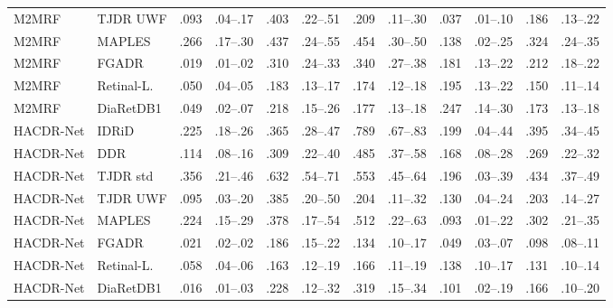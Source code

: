\begin{landscape}
{\begin{longtable}{l l c c c c c c c c c c}
M2MRF & TJDR UWF & .093 & \scriptsize .04--.17 & .403 & \scriptsize .22--.51 & .209 & \scriptsize .11--.30 & .037 & \scriptsize .01--.10 & .186 & \scriptsize .13--.22 \\
M2MRF & MAPLES & .266 & \scriptsize .17--.30 & .437 & \scriptsize .24--.55 & .454 & \scriptsize .30--.50 & .138 & \scriptsize .02--.25 & .324 & \scriptsize .24--.35 \\
M2MRF & FGADR & .019 & \scriptsize .01--.02 & .310 & \scriptsize .24--.33 & .340 & \scriptsize .27--.38 & .181 & \scriptsize .13--.22 & .212 & \scriptsize .18--.22 \\
M2MRF & Retinal-L. & .050 & \scriptsize .04--.05 & .183 & \scriptsize .13--.17 & .174 & \scriptsize .12--.18 & .195 & \scriptsize .13--.22 & .150 & \scriptsize .11--.14 \\
M2MRF & DiaRetDB1 & .049 & \scriptsize .02--.07 & .218 & \scriptsize .15--.26 & .177 & \scriptsize .13--.18 & .247 & \scriptsize .14--.30 & .173 & \scriptsize .13--.18 \\
HACDR-Net & IDRiD & .225 & \scriptsize .18--.26 & .365 & \scriptsize .28--.47 & .789 & \scriptsize .67--.83 & .199 & \scriptsize .04--.44 & .395 & \scriptsize .34--.45 \\
HACDR-Net & DDR & .114 & \scriptsize .08--.16 & .309 & \scriptsize .22--.40 & .485 & \scriptsize .37--.58 & .168 & \scriptsize .08--.28 & .269 & \scriptsize .22--.32 \\
HACDR-Net & TJDR std & .356 & \scriptsize .21--.46 & .632 & \scriptsize .54--.71 & .553 & \scriptsize .45--.64 & .196 & \scriptsize .03--.39 & .434 & \scriptsize .37--.49 \\
HACDR-Net & TJDR UWF & .095 & \scriptsize .03--.20 & .385 & \scriptsize .20--.50 & .204 & \scriptsize .11--.32 & .130 & \scriptsize .04--.24 & .203 & \scriptsize .14--.27 \\
HACDR-Net & MAPLES & .224 & \scriptsize .15--.29 & .378 & \scriptsize .17--.54 & .512 & \scriptsize .22--.63 & .093 & \scriptsize .01--.22 & .302 & \scriptsize .21--.35 \\
HACDR-Net & FGADR & .021 & \scriptsize .02--.02 & .186 & \scriptsize .15--.22 & .134 & \scriptsize .10--.17 & .049 & \scriptsize .03--.07 & .098 & \scriptsize .08--.11 \\
HACDR-Net & Retinal-L. & .058 & \scriptsize .04--.06 & .163 & \scriptsize .12--.19 & .166 & \scriptsize .11--.19 & .138 & \scriptsize .10--.17 & .131 & \scriptsize .10--.14 \\
HACDR-Net & DiaRetDB1 & .016 & \scriptsize .01--.03 & .228 & \scriptsize .12--.32 & .319 & \scriptsize .15--.34 & .101 & \scriptsize .02--.19 & .166 & \scriptsize .10--.20 \\

\end{longtable}}
\end{landscape}
